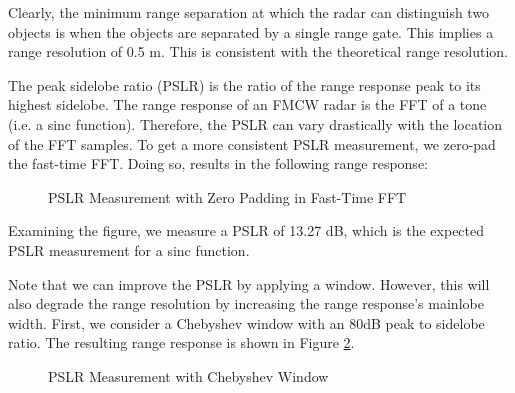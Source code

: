 \documentclass[conference]{IEEEtran}
\begin{document}
	Clearly, the minimum range separation at which the radar can distinguish two objects is when the objects are separated by a single range gate. This implies a range resolution of 0.5 m. This is consistent with the theoretical range resolution.
	
	The peak sidelobe ratio (PSLR) is the ratio of the range response peak to its highest sidelobe. The range response of an FMCW radar is the FFT of a tone (i.e. a sinc function). Therefore, the PSLR can vary drastically with the location of the FFT samples. To get a more consistent PSLR measurement, we zero-pad the fast-time FFT. Doing so, results in the following range response:
	
	\begin{figure}[H]
	    	\centering
	    	\caption{PSLR Measurement with Zero Padding in Fast-Time FFT}
	    	\label{fig::pslr_zpad}
	\end{figure}
	
	Examining the figure, we measure a PSLR of 13.27 dB, which is the expected PSLR measurement for a sinc function.
	
	Note that we can improve the PSLR by applying a window. However, this will also degrade the range resolution by increasing the range response's mainlobe width. First, we consider a Chebyshev window with an 80dB peak to sidelobe ratio. The resulting range response is shown in Figure \ref{fig::plsr_window}.
	
	\begin{figure}[H]
	    	\centering
	    	\caption{PSLR Measurement with Chebyshev Window}
	    	\label{fig::plsr_window} 
	\end{figure}
	
\end{document}
